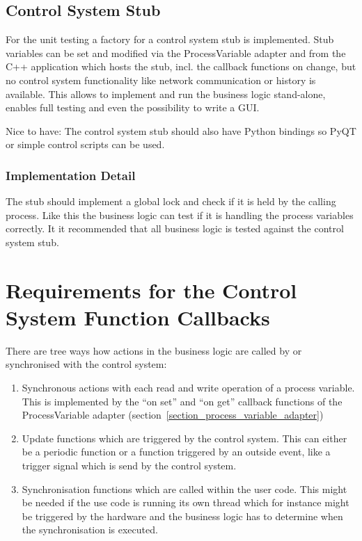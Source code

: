 \documentclass[11pt,a4paper]{scrartcl}
\begin{document}
\subsection{Control System Stub}
For the unit testing a factory for a control system stub is implemented.
Stub variables can be set and modified via the ProcessVariable adapter and from
the C++ application which hosts the stub, incl. the callback functions on
change, but no control system functionality like network communication or
history is available. This allows to implement and run the business logic
stand-alone, enables full testing and even the possibility to write a GUI.

Nice to have: The control system stub should also have Python bindings so PyQT
or simple control scripts can be used.

\subsubsection{Implementation Detail}
The stub should implement a global lock and check if it is held by the calling process.
Like this the business logic can test if it is handling the process variables correctly.
It it recommended that all business logic is tested against the control system stub.

\section{Requirements for the Control System Function Callbacks}
\label{section_function_callbacks}
There are tree ways how actions in the business logic are called by or
synchronised with the control system:
\begin{enumerate}
  \item Synchronous actions with each read and write operation of a 
    process variable. This is implemented by the ``on set'' and 
    ``on get'' callback functions of the ProcessVariable adapter
    (section~\ref{section_process_variable_adapter})
  \item Update functions which are triggered by the control system.
    This can either be a periodic function or a function triggered 
    by an outside event, like a trigger signal which is send by the
    control system.
  \item Synchronisation functions which are called within the user code.
    This might be needed if the use code is running its own thread which
    for instance might be triggered by the hardware and the business logic
    has to determine when the synchronisation is executed.
\end{enumerate}
\end{document}
